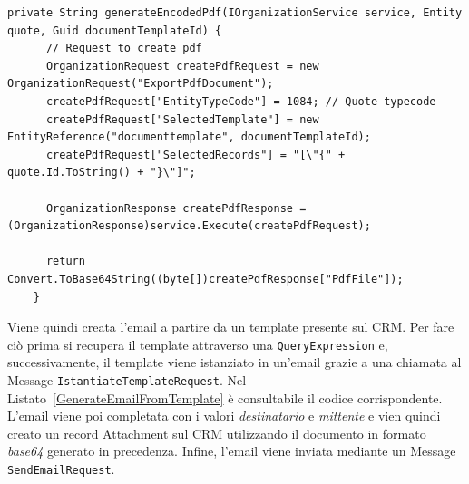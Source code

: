 \begin{lstlisting}[language={[Sharp]C},breaklines=true,label=OrganizationRequestListing,caption=Chiamata all'azione ExportPdfDocument per la creazione del documento PDF.]
  private String generateEncodedPdf(IOrganizationService service, Entity quote, Guid documentTemplateId) {
      // Request to create pdf
      OrganizationRequest createPdfRequest = new OrganizationRequest("ExportPdfDocument");
      createPdfRequest["EntityTypeCode"] = 1084; // Quote typecode
      createPdfRequest["SelectedTemplate"] = new EntityReference("documenttemplate", documentTemplateId);
      createPdfRequest["SelectedRecords"] = "[\"{" + quote.Id.ToString() + "}\"]";

      OrganizationResponse createPdfResponse = (OrganizationResponse)service.Execute(createPdfRequest);

      return Convert.ToBase64String((byte[])createPdfResponse["PdfFile"]);
    }
\end{lstlisting}

Viene quindi creata l'email a partire da un template presente sul CRM. Per fare ciò prima si recupera il template attraverso una \lstinline[language={[Sharp]C}]{QueryExpression} e, successivamente, il template viene istanziato in un'email grazie a una chiamata al Message \lstinline[language={[Sharp]C}]{IstantiateTemplateRequest}. Nel Listato~\ref{GenerateEmailFromTemplate} è consultabile il codice corrispondente.
L'email viene poi completata con i valori \textit{destinatario} e \textit{mittente} e vien quindi creato un record Attachment sul CRM utilizzando il documento in formato \textit{base64} generato in precedenza.
Infine, l'email viene inviata mediante un Message \lstinline[language={[Sharp]C}]{SendEmailRequest}.

